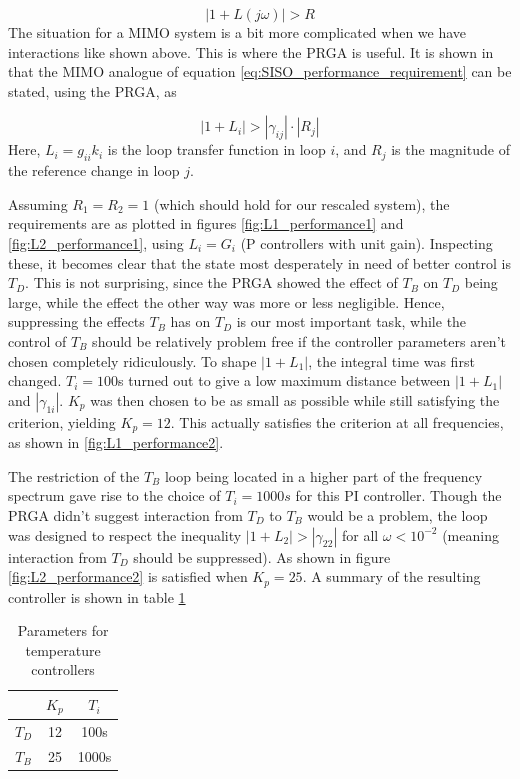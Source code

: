 \documentclass[12pt]{article}
\begin{document}
\begin{equation}
| 1 + L(j \omega) | > R
\label{eq:SISO_performance_requirement}
\end{equation}
The situation for a MIMO system is a bit more complicated when we have interactions like shown above. This is where the PRGA is useful. It is shown in \cite{skogestad} that the MIMO analogue of equation \ref{eq:SISO_performance_requirement} can be stated, using the PRGA, as

\begin{equation}
| 1 + L_i | > | \gamma_{ij} | \cdot |R_j|
\end{equation}
Here, $L_i = g_{ii}k_i$ is the loop transfer function in loop $i$, and $R_j$ is the magnitude of the reference change in loop $j$.

Assuming $R_1 = R_2 = 1$ (which should hold for our rescaled system), the requirements are as plotted in figures \ref{fig:L1_performance1} and \ref{fig:L2_performance1}, using $L_i = G_i$ (P controllers with unit gain). Inspecting these, it becomes clear that the state most desperately in need of better control is $T_D$. This is not surprising, since the PRGA showed the effect of $T_B$ on $T_D$ being large, while the effect the other way was more or less negligible. Hence, suppressing the effects $T_B$ has on $T_D$ is our most important task, while the control of $T_B$ should be relatively problem free if the controller parameters aren't chosen completely ridiculously. To shape $| 1 + L_1 |$, the integral time was first changed. $T_i = 100$s turned out to give a low maximum distance between $| 1 + L_1 |$ and $| \gamma_{1i} |$. $K_p$ was then chosen to be as small as possible while still satisfying the criterion, yielding $K_p = 12$. This actually satisfies the criterion at all frequencies, as shown in \ref{fig:L1_performance2}.

The restriction of the $T_B$ loop being located in a higher part of the frequency spectrum gave rise to the choice of $T_i = 1000s$ for this PI controller. Though the PRGA didn't suggest interaction from $T_D$ to $T_B$ would be a problem, the loop was designed to respect the inequality $| 1 + L_2 | > | \gamma_{22} |$ for all $\omega < 10^{-2}$ (meaning interaction from $T_D$ should be suppressed). As shown in figure \ref{fig:L2_performance2} is satisfied when $K_p = 25$. A summary of the resulting controller is shown in table \ref{tab:LV_parameters}

\begin{table}[h]
\centering
\begin{tabular}{c | c | c }
 & $K_p$ & $T_i$  \\ \hline
 $T_D$ & 12 & 100s \\
 $T_B$ & 25 & 1000s
\end{tabular}
\caption{Parameters for temperature controllers}
\label{tab:LV_parameters}
\end{table}
\end{document}
